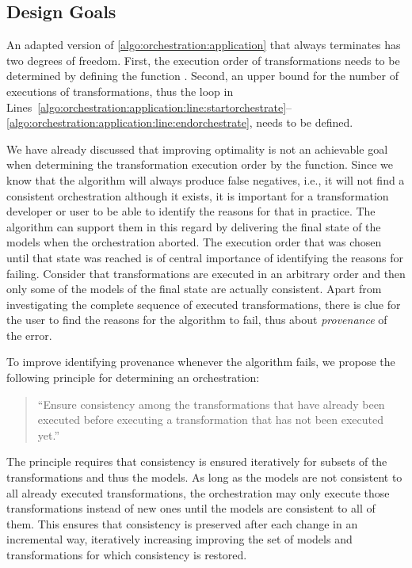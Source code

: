 
\subsection{Design Goals}
\label{chap:orchestration:algorithm:goals}

An adapted version of \autoref{algo:orchestration:application} that always terminates has two degrees of freedom.
First, the execution order of transformations needs to be determined by defining the function .
Second, an upper bound for the number of executions of transformations, thus the loop in Lines~\ref{algo:orchestration:application:line:startorchestrate}--\ref{algo:orchestration:application:line:endorchestrate}, needs to be defined.

We have already discussed that improving optimality is not an achievable goal when determining the transformation execution order by the  function.
Since we know that the algorithm will always produce false negatives, i.e., it will not find a consistent orchestration although it exists, it is important for a transformation developer or user to be able to identify the reasons for that in practice.
The algorithm can support them in this regard by delivering the final state of the models when the orchestration aborted.
The execution order that was chosen until that state was reached is of central importance of identifying the reasons for failing.
Consider that transformations are executed in an arbitrary order and then only some of the models of the final state are actually consistent.
Apart from investigating the complete sequence of executed transformations, there is clue for the user to find the reasons for the algorithm to fail, thus about \emph{provenance} of the error.

To improve identifying provenance whenever the algorithm fails, we propose the following principle for determining an orchestration:
\begin{quote}
    \enquote{Ensure consistency among the transformations that have already been executed before executing a transformation that has not been executed yet.} \cite{gleitze2020orchestration}
\end{quote}
The principle requires that consistency is ensured iteratively for subsets of the transformations and thus the models.
As long as the models are not consistent to all already executed transformations, the orchestration may only execute those transformations instead of new ones until the models are consistent to all of them.
This ensures that consistency is preserved after each change in an incremental way, iteratively increasing improving the set of models and transformations for which consistency is restored.

